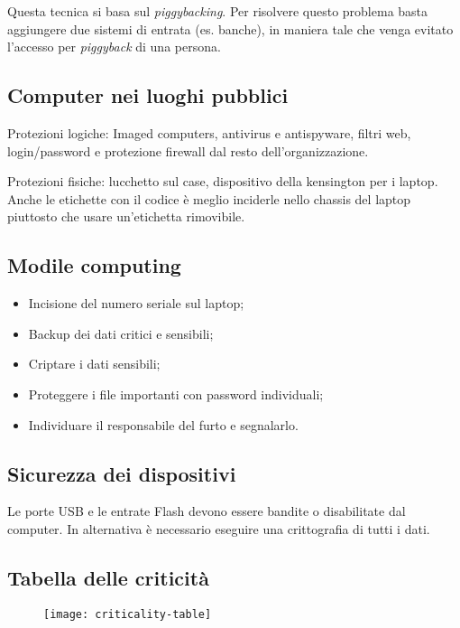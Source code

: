 Questa tecnica si basa sul \textit{piggybacking}. Per risolvere questo problema 
basta aggiungere due sistemi di entrata (es. banche), in maniera tale che venga evitato
l'accesso per \textit{piggyback} di una persona.


\subsection{Computer nei luoghi pubblici}

Protezioni logiche: Imaged computers, antivirus e antispyware, filtri web, 
login/password e protezione firewall dal resto dell'organizzazione.

Protezioni fisiche: lucchetto sul case, dispositivo della kensington per i 
laptop. Anche le etichette con il codice è meglio inciderle nello chassis del 
laptop piuttosto che usare un'etichetta rimovibile.

\subsection{Modile computing}

\begin{itemize}
\item Incisione del numero seriale sul laptop;
\item Backup dei dati critici e sensibili;
\item Criptare i dati sensibili;
\item Proteggere i file importanti con password individuali;
\item Individuare il responsabile del furto e segnalarlo.
\end{itemize}


\subsection{Sicurezza dei dispositivi}

Le porte USB e le entrate Flash devono essere bandite o disabilitate dal 
computer. In alternativa è necessario eseguire una crittografia di tutti i dati.


\subsection{Tabella delle criticità}

\begin{figure}[H]
 \centering
 \texttt{[image: criticality-table]}
\end{figure}

